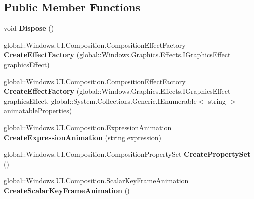 \subsection*{Public Member Functions}
\begin{DoxyCompactItemize}
\item 
\mbox{\label{class_windows_1_1_u_i_1_1_composition_1_1_compositor_ac90a7018efb0edbc42378c43cb94e3fa}} 
void {\bfseries Dispose} ()
\item 
\mbox{\label{class_windows_1_1_u_i_1_1_composition_1_1_compositor_a0f263c7b996908ce12d789c3d640ee71}} 
global\+::\+Windows.\+U\+I.\+Composition.\+Composition\+Effect\+Factory {\bfseries Create\+Effect\+Factory} (global\+::\+Windows.\+Graphics.\+Effects.\+I\+Graphics\+Effect graphics\+Effect)
\item 
\mbox{\label{class_windows_1_1_u_i_1_1_composition_1_1_compositor_ac3bb6a6e92997bf4740fbf43e243ea7a}} 
global\+::\+Windows.\+U\+I.\+Composition.\+Composition\+Effect\+Factory {\bfseries Create\+Effect\+Factory} (global\+::\+Windows.\+Graphics.\+Effects.\+I\+Graphics\+Effect graphics\+Effect, global\+::\+System.\+Collections.\+Generic.\+I\+Enumerable$<$ string $>$ animatable\+Properties)
\item 
\mbox{\label{class_windows_1_1_u_i_1_1_composition_1_1_compositor_ae872b8e5d7605ff92461b38237f26bcf}} 
global\+::\+Windows.\+U\+I.\+Composition.\+Expression\+Animation {\bfseries Create\+Expression\+Animation} (string expression)
\item 
\mbox{\label{class_windows_1_1_u_i_1_1_composition_1_1_compositor_a74091487764434fe783ce2e35bc897d2}} 
global\+::\+Windows.\+U\+I.\+Composition.\+Composition\+Property\+Set {\bfseries Create\+Property\+Set} ()
\item 
\mbox{\label{class_windows_1_1_u_i_1_1_composition_1_1_compositor_a1c091ff2583caeef8359702f57a8ee0d}} 
global\+::\+Windows.\+U\+I.\+Composition.\+Scalar\+Key\+Frame\+Animation {\bfseries Create\+Scalar\+Key\+Frame\+Animation} ()

\end{DoxyCompactItemize}
